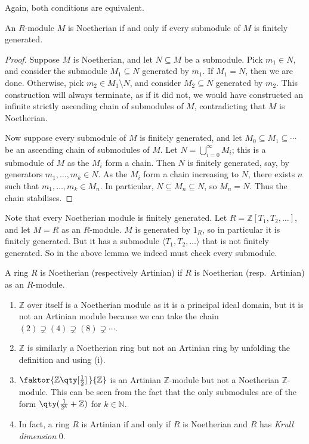 Again, both conditions are equivalent.
\begin{lemma}
    An \( R \)-module \( M \) is Noetherian if and only if every submodule of \( M \) is finitely generated.
\end{lemma}
\begin{proof}
    Suppose \( M \) is Noetherian, and let \( N \subseteq M \) be a submodule.
    Pick \( m_1 \in N \), and consider the submodule \( M_1 \subseteq N \) generated by \( m_1 \).
    If \( M_1 = N \), then we are done.
    Otherwise, pick \( m_2 \in M_1 \setminus N \), and consider \( M_2 \subseteq N \) generated by \( m_2 \).
    This construction will always terminate, as if it did not, we would have constructed an infinite strictly ascending chain of submodules of \( M \), contradicting that \( M \) is Noetherian.

    Now suppose every submodule of \( M \) is finitely generated, and let \( M_0 \subseteq M_1 \subseteq \cdots \) be an ascending chain of submodules of \( M \).
    Let \( N = \bigcup_{i = 0}^\infty M_i \); this is a submodule of \( M \) as the \( M_i \) form a chain.
    Then \( N \) is finitely generated, say, by generators \( m_1, \dots, m_k \in N \).
    As the \( M_i \) form a chain increasing to \( N \), there exists \( n \) such that \( m_1, \dots, m_k \in M_n \).
    In particular, \( N \subseteq M_n \subseteq N \), so \( M_n = N \).
    Thus the chain stabilises.
\end{proof}
Note that every Noetherian module is finitely generated.
Let \( R = \mathbb Z[T_1, T_2, \dots] \), and let \( M = R \) as an \( R \)-module.
\( M \) is generated by \( 1_R \), so in particular it is finitely generated.
But it has a submodule \( \langle T_1, T_2, \dots \rangle \) that is not finitely generated.
So in the above lemma we indeed must check every submodule.
\begin{definition}
    A ring \( R \) is Noetherian (respectively Artinian) if \( R \) is Noetherian (resp.\ Artinian) as an \( R \)-module.
\end{definition}
\begin{example}
    \begin{enumerate}
        \item \( \mathbb Z \) over itself is a Noetherian module as it is a principal ideal domain, but it is not an Artinian module because we can take the chain \( (2) \supsetneq (4) \supsetneq (8) \supsetneq \cdots \).
        \item \( \mathbb Z \) is similarly a Noetherian ring but not an Artinian ring by unfolding the definition and using (i).
        \item \( \faktor{\mathbb Z\qty[\frac{1}{2}]\,}{\mathbb Z} \) is an Artinian \( \mathbb Z \)-module but not a Noetherian \( \mathbb Z \)-module. This can be seen from the fact that the only submodules are of the form \( \qty(\frac{1}{2^k} + \mathbb Z) \) for \( k \in \mathbb N \).
        \item In fact, a ring \( R \) is Artinian if and only if \( R \) is Noetherian and \( R \) has \emph{Krull dimension} 0.
    \end{enumerate}
\end{example}

